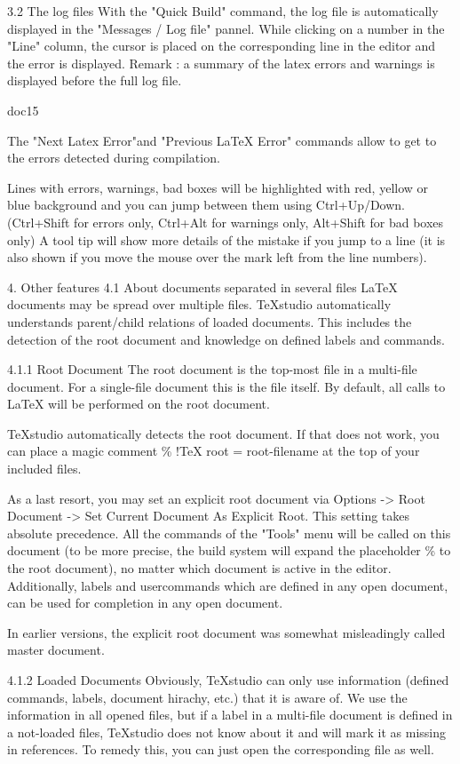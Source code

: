 \documentclass{article}
\begin{document}
	3.2 The log files
	With the "Quick Build" command, the log file is automatically displayed in the "Messages / Log file" pannel. While clicking on a number in the "Line" column, the cursor is placed on the corresponding line in the editor and the error is displayed.
	Remark : a summary of the latex errors and warnings is displayed before the full log file.
	
	doc15
	
	The "Next Latex Error"and "Previous LaTeX Error" commands allow to get to the errors detected during compilation.
	
	Lines with errors, warnings, bad boxes will be highlighted with red, yellow or blue background and you can jump between them using Ctrl+Up/Down. (Ctrl+Shift for errors only, Ctrl+Alt for warnings only, Alt+Shift for bad boxes only)
	A tool tip will show more details of the mistake if you jump to a line (it is also shown if you move the mouse over the mark left from the line numbers).
	
	4. Other features
	4.1 About documents separated in several files
	LaTeX documents may be spread over multiple files. TeXstudio automatically understands parent/child relations of loaded documents. This includes the detection of the root document and knowledge on defined labels and commands.
	
	4.1.1 Root Document
	The root document is the top-most file in a multi-file document. For a single-file document this is the file itself. By default, all calls to LaTeX will be performed on the root document.
	
	TeXstudio automatically detects the root document. If that does not work, you can place a magic comment \% !TeX root = root-filename at the top of your included files.
	
	As a last resort, you may set an explicit root document via Options -> Root Document -> Set Current Document As Explicit Root. This setting takes absolute precedence. All the commands of the "Tools" menu will be called on this document (to be more precise, the build system will expand the placeholder \% to the root document), no matter which document is active in the editor. Additionally, labels and usercommands which are defined in any open document, can be used for completion in any open document.
	
	In earlier versions, the explicit root document was somewhat misleadingly called master document.
	
	4.1.2 Loaded Documents
	Obviously, TeXstudio can only use information (defined commands, labels, document hirachy, etc.) that it is aware of. We use the information in all opened files, but if a label in a multi-file document is defined in a not-loaded files, TeXstudio does not know about it and will mark it as missing in references. To remedy this, you can just open the corresponding file as well.
	
\end{document}
